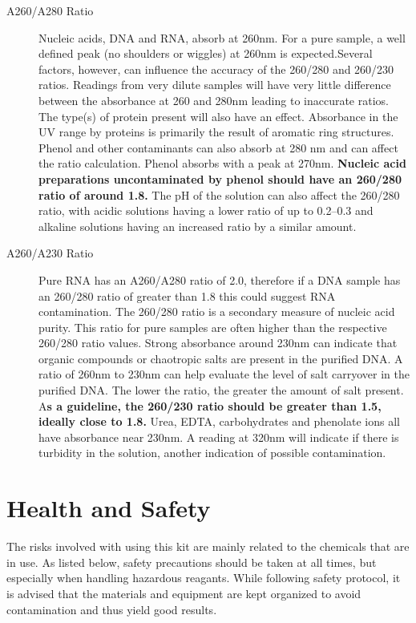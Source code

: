 \documentclass[12pt]{../SOP3_alpha}
\begin{document}
\begin{description}
  \item[A260/A280 Ratio] Nucleic acids, DNA and RNA, absorb at 260nm. For a pure sample, a well defined peak (no shoulders or wiggles) at 260nm is expected.Several factors, however, can influence the accuracy of the 260/280 and 260/230 ratios. Readings from very dilute samples will have very little difference between the absorbance at 260 and 280nm leading to inaccurate ratios.  The type(s) of protein present will also have an effect.  Absorbance in the UV range by proteins is primarily the result of aromatic ring structures. Phenol and other contaminants can also absorb at 280 nm and can affect the ratio calculation. Phenol absorbs with a peak at 270nm. \textbf{Nucleic acid preparations uncontaminated by phenol should have an 260/280 ratio of around 1.8. } The pH of the solution can also affect the 260/280 ratio, with acidic solutions having a lower ratio of up to 0.2–0.3 and alkaline solutions having an increased ratio by a similar amount.
  \item[A260/A230 Ratio] Pure RNA has an A260/A280 ratio of 2.0, therefore if a DNA sample has an 260/280 ratio of greater than 1.8 this could suggest RNA contamination. The 260/280 ratio is a secondary measure of nucleic acid purity. This ratio for pure samples are often higher than the respective 260/280 ratio values. Strong absorbance around 230nm can indicate that organic compounds or chaotropic salts are present in the purified DNA.  A ratio of 260nm to 230nm can help evaluate the level of salt carryover in the purified DNA. The lower the ratio, the greater the amount of salt present. A\textbf{s a guideline, the 260/230 ratio should be greater than 1.5, ideally close to 1.8. } Urea, EDTA, carbohydrates and phenolate ions all have absorbance near 230nm. A reading at 320nm will indicate if there is turbidity in the solution, another indication of possible contamination.  

\end{description}

\section{Health and Safety}

\NP The risks involved with using this kit are mainly related to the chemicals that are in use. As listed below, safety precautions should be taken at all times, but especially when handling hazardous reagants. While following safety protocol, it is advised that the materials and equipment are kept organized to avoid contamination and thus yield good results. 
\end{document}

